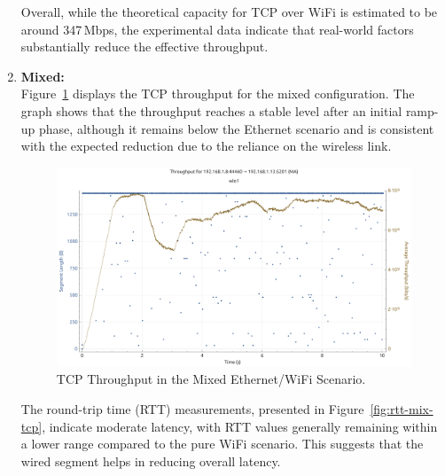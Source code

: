 \begin{enumerate}
                Overall, while the theoretical capacity for TCP over WiFi is estimated to be around 347\,Mbps, the experimental data indicate that real-world factors substantially reduce the effective throughput.

            \item \textbf{Mixed:} \\
                Figure~\ref{fig:throughput-mix-tcp} displays the TCP throughput for the mixed configuration. 
                The graph shows that the throughput reaches a stable level after an initial ramp-up phase, although it remains below the Ethernet scenario and is consistent with the expected reduction due to the reliance on the wireless link. \\

                \begin{figure}[ht]
                    \centering
                    \includegraphics[width=0.9\columnwidth]{images/graphs/Throughput/Throughput_MIX_TCP.pdf}
                    \caption{TCP Throughput in the Mixed Ethernet/WiFi Scenario.}
                    \label{fig:throughput-mix-tcp}
                \end{figure}

                The round-trip time (RTT) measurements, presented in Figure~\ref{fig:rtt-mix-tcp}, indicate moderate latency, with RTT values generally remaining within a lower range compared to the pure WiFi scenario. 
                This suggests that the wired segment helps in reducing overall latency. \\


\end{enumerate}
